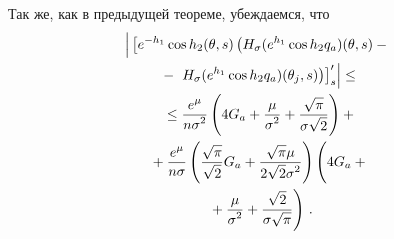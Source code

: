 \begin{multicols}{2}
Так же, как в предыдущей теореме, убеждаемся, что
\begin{multline}
\left|
\vphantom{\left.\left.+e^{-h_1}\sin{h_2}H_\sigma(e^{h_1}\sin{h_2}q_a)(\theta,s)\right)'_s\right| \leq{}}
\left[e^{-h_1}\cos{h_2}(\theta,s)\left(H_\sigma(e^{h_1}\cos{h_2}q_a)(\theta,s)-{}\right.\right.\right.\\
{}-\left.\left.\left. H_\sigma(e^{h_1}\cos{h_2}q_a)(\theta_j,s)\right)\right]'_s\right|\leq{}\\
{}\leq\fr{e^\mu}{n\sigma^2}\left(4G_a+\fr{\mu}{\sigma^2}+\fr{\sqrt{\pi}}{\sigma\sqrt{2}}\right)+{}\\
{}+\fr{e^\mu}{n\sigma}\left(\fr{\sqrt{\pi}}{\sqrt{2}}G_a+\fr{\sqrt{\pi}\mu}{2\sqrt{2}\sigma^2}\right)
\left(
\vphantom{\fr{\sqrt{2}}{\sigma\sqrt{\pi}}}
4G_a+{}\right.\\
\left.{}+\fr{\mu}{\sigma^2}+\fr{\sqrt{2}}{\sigma\sqrt{\pi}}\right)\,.
\label{e14sh}
\end{multline}


\end{multicols}
